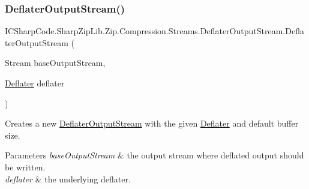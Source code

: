 \subsubsection{\texorpdfstring{Deflater\+Output\+Stream()}{DeflaterOutputStream()}\hspace{0.1cm}{\footnotesize\ttfamily [2/6]}}
{\footnotesize\ttfamily I\+C\+Sharp\+Code.\+Sharp\+Zip\+Lib.\+Zip.\+Compression.\+Streams.\+Deflater\+Output\+Stream.\+Deflater\+Output\+Stream (\begin{DoxyParamCaption}\item[{Stream}]{base\+Output\+Stream,  }\item[{\hyperlink{class_i_c_sharp_code_1_1_sharp_zip_lib_1_1_zip_1_1_compression_1_1_deflater}{Deflater}}]{deflater }\end{DoxyParamCaption})\hspace{0.3cm}{\ttfamily [inline]}}



Creates a new \hyperlink{class_i_c_sharp_code_1_1_sharp_zip_lib_1_1_zip_1_1_compression_1_1_streams_1_1_deflater_output_stream}{Deflater\+Output\+Stream} with the given \hyperlink{class_i_c_sharp_code_1_1_sharp_zip_lib_1_1_zip_1_1_compression_1_1_deflater}{Deflater} and default buffer size. 


\begin{DoxyParams}{Parameters}
{\em base\+Output\+Stream} & the output stream where deflated output should be written. \\
\hline
{\em deflater} & the underlying deflater. \\
\hline
\end{DoxyParams}
\mbox{\label{class_i_c_sharp_code_1_1_sharp_zip_lib_1_1_zip_1_1_compression_1_1_streams_1_1_deflater_output_stream_a8974b4f41beeceb684ab4c349c18b5a3}} 
